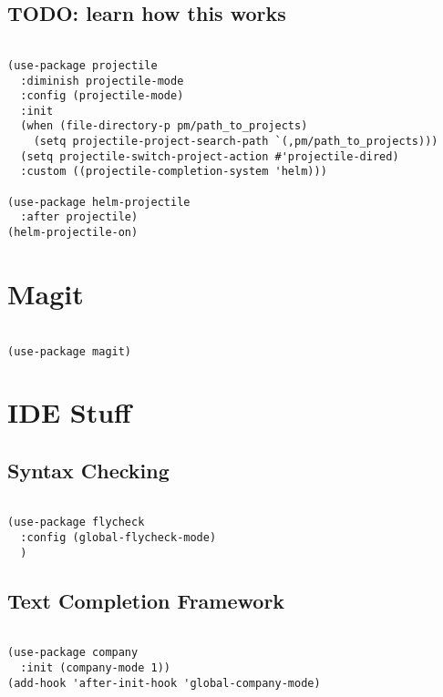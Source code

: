 \documentclass[11pt]{article}
\begin{document}
\subsection{TODO: learn how this works}
\label{sec:orgf8af1c1}

\begin{verbatim}

(use-package projectile
  :diminish projectile-mode
  :config (projectile-mode)
  :init
  (when (file-directory-p pm/path_to_projects)
	(setq projectile-project-search-path `(,pm/path_to_projects)))
  (setq projectile-switch-project-action #'projectile-dired)
  :custom ((projectile-completion-system 'helm)))

(use-package helm-projectile
  :after projectile)
(helm-projectile-on)

\end{verbatim}

\section{Magit}
\label{sec:orgda482a0}

\begin{verbatim}

(use-package magit)

\end{verbatim}

\section{IDE Stuff}
\label{sec:orge85ebc9}
\subsection{Syntax Checking}
\label{sec:org9d308f9}
\begin{verbatim}

(use-package flycheck
  :config (global-flycheck-mode)
  )

\end{verbatim}

\subsection{Text Completion Framework}
\label{sec:org014f766}
\begin{verbatim}

(use-package company
  :init (company-mode 1))
(add-hook 'after-init-hook 'global-company-mode)

\end{verbatim}
\end{document}
